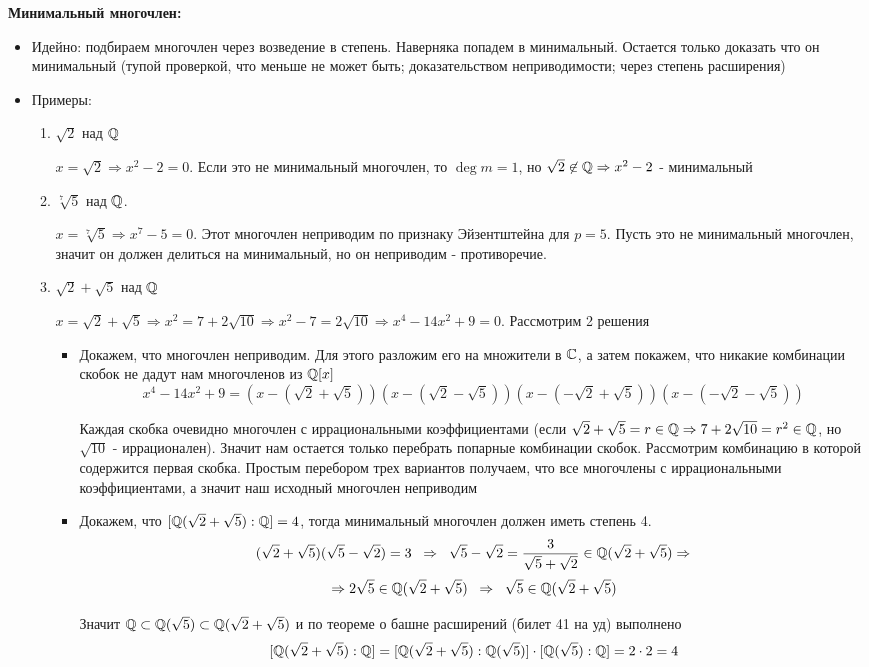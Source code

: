 \par \textbf{Минимальный многочлен:} 
\begin{itemize}
    \item Идейно: подбираем многочлен через возведение в степень. Наверняка попадем в минимальный. Остается только доказать что он минимальный (тупой проверкой, что меньше не может быть; доказательством неприводимости; через степень расширения)
    
    \item Примеры:
    \begin{enumerate}
        \item $\sqrt{2}$ над $\mathbb{Q}$
        \par $x=\sqrt{2} \Rightarrow x^2-2=0$. Если это не минимальный многочлен, то $\deg m=1$, но $\sqrt{2} \not\in \mathbb{Q} \Rightarrow x^2-2$ - минимальный
        \item $\sqrt[7]{5}$ над $\mathbb{Q}$.
        \par $x=\sqrt[7]{5}\Rightarrow x^7-5=0$. Этот многочлен неприводим по признаку Эйзентштейна для $p=5$. Пусть это не минимальный многочлен, значит он должен делиться на минимальный, но он неприводим - противоречие.
        
        \item $\sqrt{2}+\sqrt{5}$ над $\mathbb{Q}$
        \par $x=\sqrt{2}+\sqrt{5}\Rightarrow x^2=7+2\sqrt{10}\Rightarrow x^2-7=2\sqrt{10}\Rightarrow x^4-14x^2+9=0$. Рассмотрим 2 решения \begin{itemize}
            \item Докажем, что многочлен неприводим. Для этого разложим его на множители в $\mathbb{C}$, а затем покажем, что никакие комбинации скобок не дадут нам многочленов из $\mathbb{Q}[x]$
            $$x^4-14x^2+9=(x-(\sqrt{2}+\sqrt{5}))(x-(\sqrt{2}-\sqrt{5}))(x-(-\sqrt{2}+\sqrt{5}))(x-(-\sqrt{2}-\sqrt{5}))$$
            \par Каждая скобка очевидно многочлен с иррациональными коэффициентами (если $\sqrt{2}+\sqrt{5}=r\in \mathbb{Q} \Rightarrow 7+2\sqrt{10}=r^2 \in \mathbb{Q}$, но $\sqrt{10}$ - иррационален). Значит нам остается только перебрать попарные комбинации скобок. Рассмотрим комбинацию в которой содержится первая скобка. Простым перебором трех вариантов получаем, что все многочлены с иррациональными коэффициентами, а значит наш исходный многочлен неприводим
            \item Докажем, что $[\mathbb{Q}(\sqrt{2}+\sqrt{5}):\mathbb{Q}]=4$, тогда минимальный многочлен должен иметь степень 4. 
            $$(\sqrt{2}+\sqrt{5})(\sqrt{5}-\sqrt{2})=3 \;\;\Rightarrow\;\; \sqrt{5}-\sqrt{2}=\frac{3}{\sqrt{5}+\sqrt{2}} \in \mathbb{Q}(\sqrt{2}+\sqrt{5}) \Rightarrow$$ $$\Rightarrow 2\sqrt{5} \in \mathbb{Q}(\sqrt{2}+\sqrt{5}) \;\;\Rightarrow\;\; \sqrt{5} \in \mathbb{Q}(\sqrt{2}+\sqrt{5})$$
            \par Значит $\mathbb{Q} \subset \mathbb{Q}(\sqrt{5}) \subset \mathbb{Q}(\sqrt{2}+\sqrt{5})$ и по теореме о башне расширений (билет 41 на уд) выполнено
            $$[\mathbb{Q}(\sqrt{2}+\sqrt{5}):\mathbb{Q}]=[\mathbb{Q}(\sqrt{2}+\sqrt{5}):\mathbb{Q}(\sqrt{5})]\cdot [\mathbb{Q}(\sqrt{5}):\mathbb{Q}]=2\cdot 2=4$$
        \end{itemize}
    \end{enumerate}
\end{itemize}

